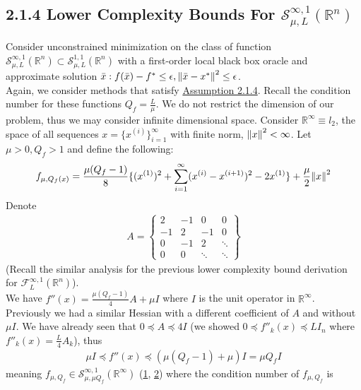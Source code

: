 \documentclass[12pt,a4paper]{article}
\begin{document}
	 \subsection*{2.1.4 Lower Complexity Bounds For $\mathcal{S}_{\mu,L}^{\infty, 1}(\mathbb{R}^n)$}
	 Consider unconstrained minimization on the class of function $\mathcal{S}_{\mu,L}^{\infty, 1}(\mathbb{R}^n) \subset \mathcal{S}_{\mu,L}^{1, 1}(\mathbb{R}^n)$ with a first-order local black box oracle and approximate solution $\bar{x}: f(\bar{x}) - f^* \leq \epsilon , \norm{\bar{x} - x^*}^2 \leq \epsilon$.\\
	 Again, we consider methods that satisfy \hyperref[A214]{Assumption 2.1.4}. Recall the condition number for these functions $Q_f = \frac{L}{\mu}$. We do not restrict the dimension of our problem, thus we may consider infinite dimensional space. Consider $\mathbb{R}^{\infty} \equiv l_2$, the space of all sequences $x = \{x^{(i)}\}_{i=1}^{\infty}$ with finite norm, $\norm{x}^2 < \infty$. Let $\mu >0, Q_f > 1$ and define the following:
	 \begin{align*}
	 	f_{\mu,Q_f(x)} = \frac{\mu(Q_f - 1)}{8}\{(x^{(1)})^2 + \sum_{i=1}^{\infty}(x^{(i)} - x^{(i+1)})^2 - 2x^{(1)}\} + \frac{\mu}{2}\norm{x}^2 
	 \end{align*}
	 Denote
	 \begin{align*}
	 	A = 
	 	\begin{Bmatrix}
	 		2 & -1 & 0 & 0 \\
	 		-1 & 2 & -1 & 0 \\
	 		0 & -1 & 2 & \ddots \\
	 		0 & 0 & \ddots & \ddots 
	 	\end{Bmatrix}
	 \end{align*}
	 (Recall the similar analysis for the previous lower complexity bound derivation for \hyperref[sec212]{$\mathcal{F}_L^{\infty,1}(\mathbb{R}^n)$}). \\
	 We have $f''(x) = \frac{\mu(Q_f - 1)}{4}A + \mu I$ where $I$ is the unit operator in $\mathbb{R}^{\infty}$. Previously we had a similar Hessian with a different coefficient of $A$ and without $\mu I$. We have already seen that $0 \preceq A \preceq 4I$ (we showed $0 \preceq f''_k(x) \preceq L I_n$ where $f''_k(x)= \frac{L}{4}A_k$), thus
	 \begin{align*}
	 	\mu I \preceq f''(x) \preceq (\mu(Q_f - 1) + \mu)I = \mu Q_f I
	 \end{align*}
	 meaning $f_{\mu,Q_f} \in \mathcal{S}_{\mu,\mu Q_f}^{\infty,1}(\mathbb{R}^{\infty})$ (\hyperref[thm2111]{1}, \hyperref[thm216]{2}) where the condition number of $f_{\mu,Q_f}$ is 
\end{document}
